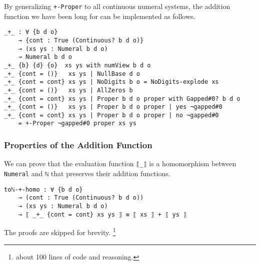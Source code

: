 \documentclass[\main/thesis.tex]{subfiles}
\begin{document}
By generalizing \lstinline|+-Proper| to all continuous numeral systems,
the addition function we have been long for can be implemented as follows.

\begin{lstlisting}[basicstyle=\ttfamily\scriptsize]
_+_ : ∀ {b d o}
    → {cont : True (Continuous? b d o)}
    → (xs ys : Numeral b d o)
    → Numeral b d o
_+_ {b} {d} {o}  xs ys with numView b d o
_+_ {cont = ()}   xs ys | NullBase d o
_+_ {cont = cont} xs ys | NoDigits b o = NoDigits-explode xs
_+_ {cont = ()}   xs ys | AllZeros b
_+_ {cont = cont} xs ys | Proper b d o proper with Gapped#0? b d o
_+_ {cont = ()}   xs ys | Proper b d o proper | yes ¬gapped#0
_+_ {cont = cont} xs ys | Proper b d o proper | no ¬gapped#0
    = +-Proper ¬gapped#0 proper xs ys
\end{lstlisting}

\subsubsection{Properties of the Addition Function}

We can prove that the evaluation function \lstinline|⟦_⟧| is a homomorphism
between \lstinline|Numeral| and \lstinline|ℕ| that preserves their addition
functions.

\begin{lstlisting}[basicstyle=\ttfamily\scriptsize]
toℕ-+-homo : ∀ {b d o}
    → (cont : True (Continuous? b d o))
    → (xs ys : Numeral b d o)
    → ⟦ _+_ {cont = cont} xs ys ⟧ ≡ ⟦ xs ⟧ + ⟦ ys ⟧
\end{lstlisting}

The proofs are skipped for brevity.
\footnote{about 100 lines of code and reasoning.}
\end{document}
